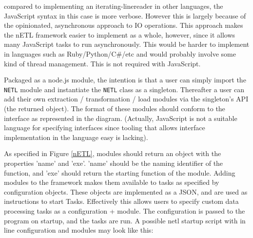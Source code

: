 compared to implementing an iterating-linereader in other languages, the JavaScript syntax in this case is more verbose. However this is largely because of the opinionated, asynchronous approach to IO operations. This approach makes the nETL framework easier to implement as a whole, however, since it allows many JavaScript tasks to run asynchronously. This would be harder to implement in languages such as Ruby/Python/C\#/etc and would probably involve some kind of thread management. This is not required with JavaScript.

Packaged as a node.js module, the intention is that a user can simply import the \texttt{NETL} module and instantiate the \texttt{NETL} class as a singleton. Thereafter a user can add their own extraction / transformation / load modules via the singleton's API (the returned object). The format of these modules should conform to the interface as represented in the diagram. (Actually, JavaScript is not a suitable language for specifying interfaces since tooling that allows interface implementation in the language easy is lacking).

As specified in Figure \ref{nETL}, modules should return an object with the properties 'name' and 'exe'. 'name' should be the naming identifier of the function, and 'exe' should return the starting function of the module. Adding modules to the framework makes them available to tasks as specified by configuration objects. These objects are implemented as a JSON, and are used as instructions to start Tasks. Effectively this allows users to specify custom data processing tasks as a configuration + module. The configuration is passed to the program on startup, and the tasks are run. A possible netl startup script with in line configuration and modules may look like this:

